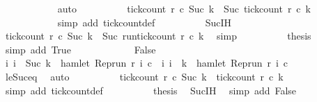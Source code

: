 \begin{isabellebody}
\ \ \ \ \ \ \ \ \ \ \isamarkupfalse%
\ auto\isanewline
\ \ \ \ \ \ \ \ \isamarkupfalse%
\ {\isacartoucheopen}tick{\isacharunderscore}count\ r\ c\ {\isacharparenleft}Suc\ k{\isacharparenright}\ {\isacharequal}\ Suc\ {\isacharparenleft}tick{\isacharunderscore}count\ r\ c\ k{\isacharparenright}{\isacartoucheclose}\isanewline
\ \ \ \ \ \ \ \ \ \ \isamarkupfalse%
\ {\isacharparenleft}simp\ add{\isacharcolon}\ tick{\isacharunderscore}count{\isacharunderscore}def{\isacharparenright}\isanewline
\ \ \ \ \ \ \ \ \isamarkupfalse%
\ Suc{\isachardot}IH\ \isamarkupfalse%
\ {\isacartoucheopen}tick{\isacharunderscore}count\ r\ c\ {\isacharparenleft}Suc\ k{\isacharparenright}\ {\isacharequal}\ Suc\ {\isacharparenleft}run{\isacharunderscore}tick{\isacharunderscore}count\ r\ c\ k{\isacharparenright}{\isacartoucheclose}\ \isamarkupfalse%
\ simp\isanewline
\ \ \ \ \ \ \ \ \isamarkupfalse%
\ {\isacharquery}thesis\ \isamarkupfalse%
\ {\isacharparenleft}simp\ add{\isacharcolon}\ True{\isacharparenright}\isanewline
\ \ \ \ \isamarkupfalse%
\isanewline
\ \ \ \ \ \ \isamarkupfalse%
\ False\isanewline
\ \ \ \ \ \ \ \ \isamarkupfalse%
\ {\isacartoucheopen}{\isacharbraceleft}i{\isachardot}\ i\ {\isasymle}\ Suc\ k\ {\isasymand}\ hamlet\ {\isacharparenleft}{\isacharparenleft}Rep{\isacharunderscore}run\ r{\isacharparenright}\ i\ c{\isacharparenright}{\isacharbraceright}\ {\isacharequal}\ {\isacharbraceleft}i{\isachardot}\ i\ {\isasymle}\ k\ {\isasymand}\ hamlet\ {\isacharparenleft}{\isacharparenleft}Rep{\isacharunderscore}run\ r{\isacharparenright}\ i\ c{\isacharparenright}{\isacharbraceright}{\isacartoucheclose}\isanewline
\ \ \ \ \ \ \ \ \ \ \isamarkupfalse%
\ le{\isacharunderscore}Suc{\isacharunderscore}eq\ \isamarkupfalse%
\ auto\isanewline
\ \ \ \ \ \ \ \ \isamarkupfalse%
\ {\isacartoucheopen}tick{\isacharunderscore}count\ r\ c\ {\isacharparenleft}Suc\ k{\isacharparenright}\ {\isacharequal}\ tick{\isacharunderscore}count\ r\ c\ k{\isacartoucheclose}\ \isamarkupfalse%
\ {\isacharparenleft}simp\ add{\isacharcolon}\ tick{\isacharunderscore}count{\isacharunderscore}def{\isacharparenright}\isanewline
\ \ \ \ \ \ \ \ \isamarkupfalse%
\ {\isacharquery}thesis\ \isamarkupfalse%
\ Suc{\isachardot}IH\ \isamarkupfalse%
\ {\isacharparenleft}simp\ add{\isacharcolon}\ False{\isacharparenright}\isanewline

\end{isabellebody}
